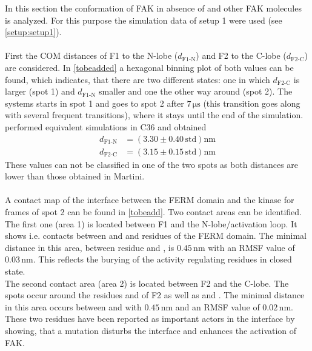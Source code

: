 In this section the conformation of FAK in absence of \pip{} and other FAK molecules is analyzed. For this purpose the simulation data of setup 1 were used (see \autoref{setup:setup1}).\\
\\
First the COM distances of F1 to the N-lobe ($d_\text{F1-N}$) and F2 to the C-lobe ($d_\text{F2-C}$) are considered. In \autoref{tobeadded} a hexagonal binning plot of both values can be found, which indicates, that there are two different states: one in which $d_\text{F2-C}$ is larger (spot 1) and $d_\text{F1-N}$ smaller and one the other way around (spot 2). The systems starts in spot 1 and goes to spot 2 after $7\,\si{\micro\second}$ (this transition goes along with several frequent transitions), where it stays until the end of the simulation.\\
\textcite{jing} performed equivalent simulations in C36 and obtained
\begin{align}
	d_\text{F1-N} &= (3.30 \pm 0.40\,\text{std})\si{\nano\metre}\\
	d_\text{F2-C} &= (3.15 \pm 0.15\,\text{std})\si{\nano\metre}
\end{align}
These values can not be classified in one of the two spots as both distances are lower than those obtained in Martini.\\
\\
A contact map of the interface between the FERM domain and the kinase for frames of spot 2 can be found in \autoref{tobeadd}. Two contact areas can be identified. The first one (area 1) is located between F1 and the N-lobe/activation loop. It shows i.e. contacts between  and  and residues of the FERM domain. The minimal distance in this area, between residue  and , is $0.45\,\si{\nano\metre}$ with an RMSF value of $0.03\,\si{\nano\metre}$. This reflects the burying of the activity regulating residues in closed state.\\
The second contact area (area 2) is located between F2 and the C-lobe. The spots occur around the residues  and  of F2 as well as  and . The minimal distance in this area occurs between  and  with $0.45\,\si{\nano\metre}$ and an RMSF value of $0.02\,\si{\nano\metre}$. These two residues have been reported as important actors in the interface by showing, that a mutation disturbs the interface and enhances the activation of FAK.\\
